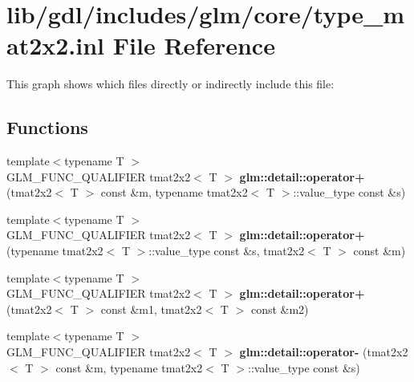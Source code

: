\hypertarget{type__mat2x2_8inl}{}\section{lib/gdl/includes/glm/core/type\+\_\+mat2x2.inl File Reference}
\label{type__mat2x2_8inl}
This graph shows which files directly or indirectly include this file\+:
\subsection*{Functions}
\begin{DoxyCompactItemize}
\item 
\hypertarget{namespaceglm_1_1detail_a9cffdd7bde333fedc1d9505bf98cf795}{}{\footnotesize template$<$typename T $>$ }\\G\+L\+M\+\_\+\+F\+U\+N\+C\+\_\+\+Q\+U\+A\+L\+I\+F\+I\+E\+R tmat2x2$<$ T $>$ {\bfseries glm\+::detail\+::operator+} (tmat2x2$<$ T $>$ const \&m, typename tmat2x2$<$ T $>$\+::value\+\_\+type const \&s)\label{namespaceglm_1_1detail_a9cffdd7bde333fedc1d9505bf98cf795}

\item 
\hypertarget{namespaceglm_1_1detail_a7992c910426c0bf977c3d3d60f3eabdd}{}{\footnotesize template$<$typename T $>$ }\\G\+L\+M\+\_\+\+F\+U\+N\+C\+\_\+\+Q\+U\+A\+L\+I\+F\+I\+E\+R tmat2x2$<$ T $>$ {\bfseries glm\+::detail\+::operator+} (typename tmat2x2$<$ T $>$\+::value\+\_\+type const \&s, tmat2x2$<$ T $>$ const \&m)\label{namespaceglm_1_1detail_a7992c910426c0bf977c3d3d60f3eabdd}

\item 
\hypertarget{namespaceglm_1_1detail_a70c7e6874253adcbdbd7203deaf51b79}{}{\footnotesize template$<$typename T $>$ }\\G\+L\+M\+\_\+\+F\+U\+N\+C\+\_\+\+Q\+U\+A\+L\+I\+F\+I\+E\+R tmat2x2$<$ T $>$ {\bfseries glm\+::detail\+::operator+} (tmat2x2$<$ T $>$ const \&m1, tmat2x2$<$ T $>$ const \&m2)\label{namespaceglm_1_1detail_a70c7e6874253adcbdbd7203deaf51b79}

\item 
\hypertarget{namespaceglm_1_1detail_a3098613ac2f602071aa93bacaede3533}{}{\footnotesize template$<$typename T $>$ }\\G\+L\+M\+\_\+\+F\+U\+N\+C\+\_\+\+Q\+U\+A\+L\+I\+F\+I\+E\+R tmat2x2$<$ T $>$ {\bfseries glm\+::detail\+::operator-\/} (tmat2x2$<$ T $>$ const \&m, typename tmat2x2$<$ T $>$\+::value\+\_\+type const \&s)\label{namespaceglm_1_1detail_a3098613ac2f602071aa93bacaede3533}


\end{DoxyCompactItemize}
